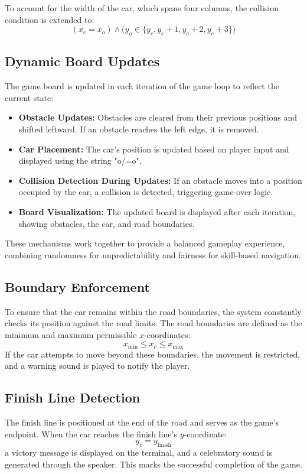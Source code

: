 \documentclass[conference]{IEEEtran}
\begin{document}
To account for the width of the car, which spans four columns, the collision condition is extended to:  
\begin{equation}  
(x_c = x_o) \land \big(y_o \in \{y_c, y_c + 1, y_c + 2, y_c + 3\}\big)  
\end{equation} 

\subsection{Dynamic Board Updates}  
The game board is updated in each iteration of the game loop to reflect the current state:  

\begin{itemize}  
    \item \textbf{Obstacle Updates:} Obstacles are cleared from their previous positions and shifted leftward. If an obstacle reaches the left edge, it is removed.  
    \item \textbf{Car Placement:} The car's position is updated based on player input and displayed using the string "o/=\o".  
    \item \textbf{Collision Detection During Updates:} If an obstacle moves into a position occupied by the car, a collision is detected, triggering game-over logic.  
    \item \textbf{Board Visualization:} The updated board is displayed after each iteration, showing obstacles, the car, and road boundaries.  
\end{itemize}  

These mechanisms work together to provide a balanced gameplay experience, combining randomness for unpredictability and fairness for skill-based navigation.  


\subsection{Boundary Enforcement}
To ensure that the car remains within the road boundaries, the system constantly checks its position against the road limits. The road boundaries are defined as the minimum and maximum permissible $x$-coordinates:
\begin{equation}
x_{\text{min}} \leq x_c \leq x_{\text{max}}
\end{equation}
If the car attempts to move beyond these boundaries, the movement is restricted, and a warning sound is played to notify the player.

\subsection{Finish Line Detection}
The finish line is positioned at the end of the road and serves as the game's endpoint. When the car reaches the finish line's $y$-coordinate:
\begin{equation}
y_c = y_{\text{finish}}
\end{equation}
a victory message is displayed on the terminal, and a celebratory sound is generated through the speaker. This marks the successful completion of the game.
\end{document}
